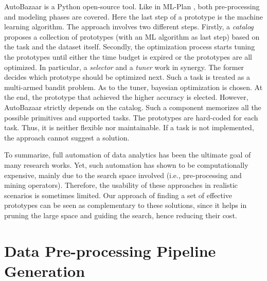 AutoBazaar \cite{AutoBazaar} is a Python open-source tool.
Like in ML-Plan \cite{mohr2018ml}, both pre-processing and modeling phases are covered.
Here the last step of a prototype is the machine learning algorithm.
The approach involves two different steps.
Firstly, a \textit{catalog} proposes a collection of prototypes (with an ML algorithm as last step) based on the task and the dataset itself.
Secondly, the optimization process starts tuning the prototypes until either the time budget is expired or the prototypes are all optimized.
In particular, a \textit{selector} and a \textit{tuner} work in synergy.
The former decides which prototype should be optimized next.
Such a task is treated as a multi-armed bandit problem.
As to the tuner, bayesian optimization is chosen.
At the end, the prototype that achieved the higher accuracy is elected.
However, AutoBazaar strictly depends on the catalog.
Such a component memorizes all the possible primitives and supported tasks.
The prototypes are hard-coded for each task.
Thus, it is neither flexible nor maintainable.
If a task is not implemented, the approach cannot suggest a solution.

To summarize, full automation of data analytics has been the ultimate goal of many research works.
Yet, such automation has shown to be computationally expensive, mainly due to the search space involved (i.e., pre-processing and mining operators).
Therefore, the usability of these approaches in realistic scenarios is sometimes limited.
Our approach of finding a set of effective prototypes can be seen as complementary to these solutions, since it helps in pruning the large space and guiding the search, hence reducing their cost.






\section{Data Pre-processing Pipeline Generation}
\label{effective-sec:methodology}

